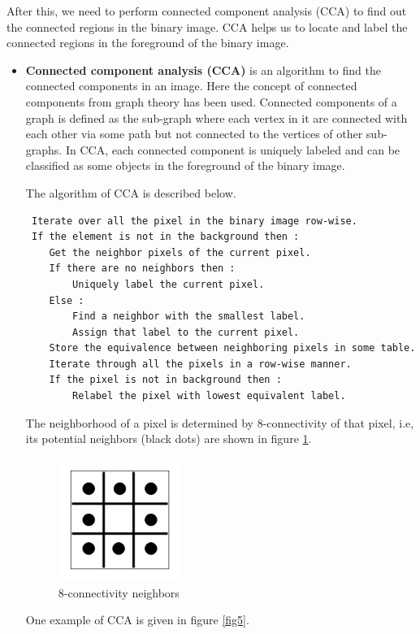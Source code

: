  \par After this, we need to perform connected component analysis (CCA) to find out the connected regions in the binary image. CCA helps us to locate and label the connected regions in the foreground of the binary image. 
 \begin{itemize}
     \item \textbf{Connected component analysis (CCA)} is an algorithm to find the connected components in an image. Here the concept of connected components from graph theory has been used. Connected components of a graph is defined as the sub-graph where each vertex in it are connected with each other via some path but not connected to the vertices of other sub-graphs. In CCA, each connected component is uniquely labeled and can be classified as some objects in the foreground of the binary image. 
 \par The algorithm of CCA is described below. 
 \begin{lstlisting}
 Iterate over all the pixel in the binary image row-wise.
 If the element is not in the background then : 
    Get the neighbor pixels of the current pixel.
    If there are no neighbors then : 
        Uniquely label the current pixel.
    Else :
        Find a neighbor with the smallest label.
        Assign that label to the current pixel.
    Store the equivalence between neighboring pixels in some table.
    Iterate through all the pixels in a row-wise manner.
    If the pixel is not in background then : 
        Relabel the pixel with lowest equivalent label.
 \end{lstlisting}
 The neighborhood of a pixel is determined by 8-connectivity of that pixel, i.e, its potential neighbors (black dots) are shown in figure \ref{fig4}. 
\begin{figure}[!htb]
\centerline{\includegraphics[height=40mm,width=40mm]{img/rd4.png}}
\caption{8-connectivity neighbors}
\label{fig4}
\end{figure}
 
 \par One example of CCA is given in figure \ref{fig5}.
 

\end{itemize}
